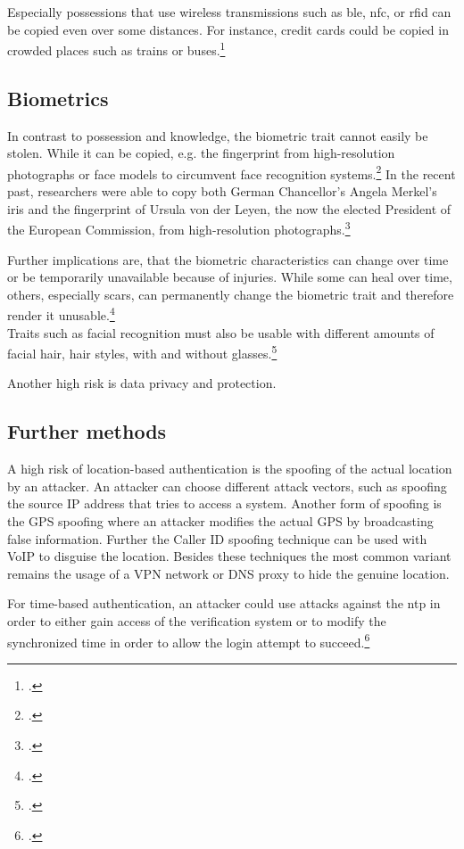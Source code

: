 Especially possessions that use wireless transmissions such as \gls{ble}, \gls{nfc}, or \gls{rfid} can be copied even over some distances. For instance, credit cards could be copied in crowded places such as trains or buses.\footcite{6892730}

\subsection{Biometrics}

In contrast to possession and knowledge, the biometric trait cannot easily be stolen. While it can be copied, e.g. the fingerprint from high-resolution photographs or 
face models to circumvent face recognition systems.\footcites[][]{185181}[][]{220566} In the recent past, researchers were able to copy both German Chancellor's Angela Merkel's iris and the fingerprint of Ursula von der Leyen, the now the elected President of the European Commission, from high-resolution photographs.\footcite{ccc-merkel}

Further implications are, that the biometric characteristics can change over time or be temporarily unavailable because of injuries. While some can heal over time, others, especially scars, can permanently change the biometric trait and therefore render it unusable.\footcite[See][52]{Jain2011}\\
Traits such as facial recognition must also be usable with different amounts of facial hair, hair styles, with and without glasses.\footcite[See][98]{Jain2011}

Another high risk is data privacy and protection.

\subsection{Further methods}

A high risk of location-based authentication is the spoofing of the actual location by an attacker. An attacker can choose different attack vectors, such as spoofing the source IP address that tries to access a system. Another form of spoofing is the GPS spoofing where an attacker modifies the actual GPS by broadcasting false information. Further the Caller ID spoofing technique can be used with VoIP to disguise the location. Besides these techniques the most common variant remains the usage of a VPN network or DNS proxy to hide the genuine location.

For time-based authentication, an attacker could use attacks against the \gls{ntp} in order to either gain access of the verification system or to modify the synchronized time in order to allow the login attempt to succeed.\footcite[See][]{malhotraattacking}

